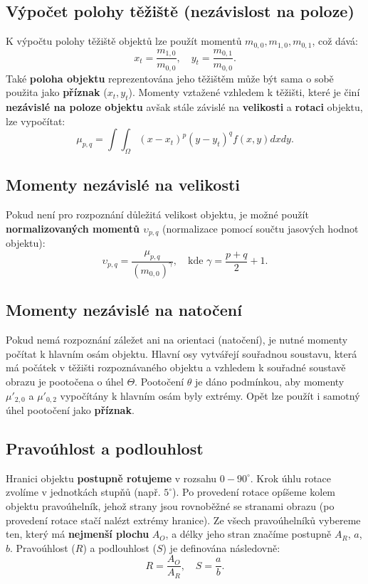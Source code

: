 \subsection*{Výpočet polohy těžiště (nezávislost na poloze)}
K výpočtu polohy těžiště objektů lze použít momentů $m_{0,0}, m_{1,0}, m_{0,1}$, což dává:
\begin{equation*}
    x_t = \frac{m_{1,0}}{m_{0,0}}, \quad y_t = \frac{m_{0,1}}{m_{0,0}}.
\end{equation*}
Také \textbf{poloha objektu} reprezentována jeho těžištěm může být sama o sobě použita jako \textbf{příznak} ($x_t, y_t$). Momenty vztažené vzhledem k těžišti, které je činí \textbf{nezávislé na poloze objektu} avšak stále závislé na \textbf{velikosti} a \textbf{rotaci} objektu, lze vypočítat:
\begin{equation*}
    \mu_{p, q} = \int{}\int_\Omega (x - x_t)^p (y - y_t)^q f(x, y)dx dy.
\end{equation*}

\subsection*{Momenty nezávislé na velikosti}
Pokud není pro rozpoznání důležitá velikost objektu, je možné použít \textbf{normalizovaných momentů $\upsilon_{p, q}$} (normalizace pomocí součtu jasových hodnot objektu):
\begin{equation*}
    \upsilon_{p, q} = \frac{\mu_{p, q}}{(m_{0, 0})^\gamma}, \quad \textrm{kde } \gamma = \frac{p + q}{2} + 1.
\end{equation*}

\subsection*{Momenty nezávislé na natočení}
Pokud nemá rozpoznání záležet ani na orientaci (natočení), je nutné momenty počítat k hlavním osám objektu. Hlavní osy vytvářejí souřadnou soustavu, která má počátek v těžišti rozpoznávaného objektu a vzhledem k souřadné soustavě obrazu je pootočena o úhel $\Theta$. Pootočení $\theta$ je dáno podmínkou, aby momenty $\mu'_{2, 0}$ a $ \mu'_{0, 2}$ vypočítány k hlavním osám byly extrémy. Opět lze použít i samotný úhel pootočení jako \textbf{příznak}.

\subsection{Pravoúhlost a podlouhlost}
Hranici objektu \textbf{postupně rotujeme} v rozsahu $0 - 90^\circ$. Krok úhlu rotace zvolíme v jednotkách stupňů (např. $5^\circ$). Po provedení rotace opíšeme kolem objektu pravoúhelník, jehož strany jsou rovnoběžné se stranami obrazu (po provedení rotace stačí nalézt extrémy hranice). Ze všech pravoúhelníků vybereme ten, který má \textbf{nejmenší plochu} $A_O$, a délky jeho stran značíme postupně $A_R$, $a$, $b$. Pravoúhlost ($R$) a podlouhlost ($S$) je definována následovně:
\begin{equation*}
    R = \frac{A_O}{A_R}, \quad S = \frac{a}{b}.
\end{equation*}

